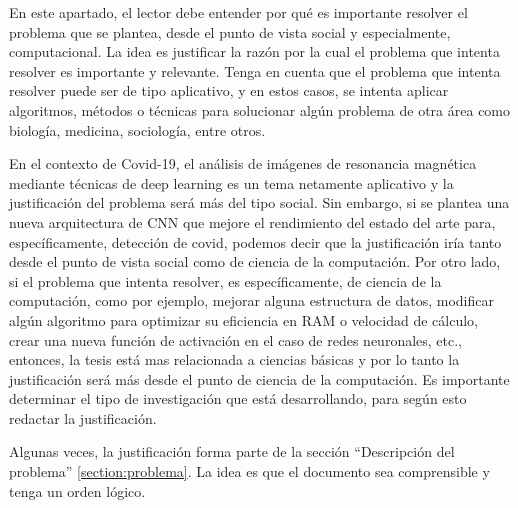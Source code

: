 
En este apartado, el lector debe entender por qué es importante resolver el problema que se plantea, desde el punto de vista social y especialmente, computacional. La idea es justificar la razón por la cual el problema que intenta resolver es importante y relevante. Tenga en cuenta que el problema que intenta resolver puede ser de tipo aplicativo, y en estos casos, se intenta aplicar algoritmos, métodos o técnicas para solucionar algún problema de otra área como biología, medicina, sociología, entre otros. \\

\begin{tcolorbox}[colback=blue!5!white,colframe=blue!75!black,title=Ejemplo]
En el contexto de Covid-19, el análisis de imágenes de resonancia magnética mediante técnicas de deep learning es un tema netamente aplicativo y la justificación del problema será más del tipo social. Sin embargo, si se plantea una nueva arquitectura de CNN que mejore el rendimiento del estado del arte para, específicamente, detección de covid, podemos decir que la justificación iría tanto desde el punto de vista social como de ciencia de la computación. Por otro lado, si el problema que intenta resolver, es específicamente, de ciencia de la computación, como por ejemplo, mejorar alguna estructura de datos, modificar algún algoritmo para optimizar su eficiencia en RAM o velocidad de cálculo, crear una nueva función de activación en el caso de redes neuronales, etc., entonces, la tesis está mas relacionada a ciencias básicas y por lo tanto la justificación será más desde el punto de ciencia de la computación. Es importante determinar el tipo de investigación que está desarrollando, para según esto redactar la justificación.
\end{tcolorbox}

Algunas veces, la justificación forma parte de la sección ``Descripción del problema'' \ref{section:problema}. La idea es que el documento sea comprensible y tenga un orden lógico.
